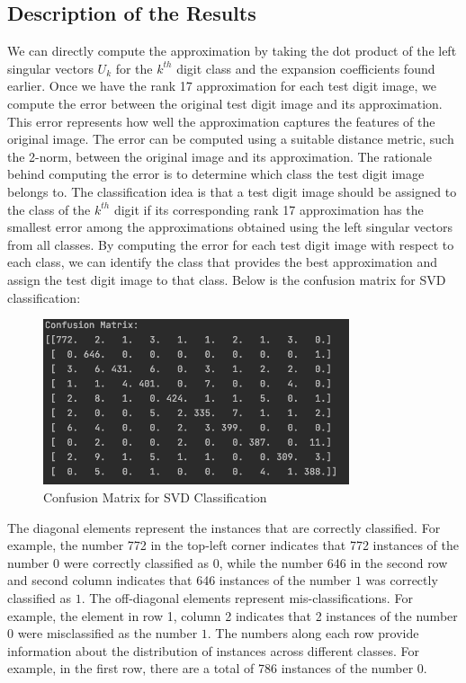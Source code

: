 \documentclass{article} %
\begin{document}
        \subsection{Description of the Results}
            \label{SECT: SECTION 4.2}
            We can directly compute the approximation by taking the dot product of the left singular vectors $U_k$ for the $k^{th}$ digit class and the expansion coefficients found earlier. Once we have the rank 17 approximation for each test digit image, we compute the error between the original test digit image and its approximation. This error represents how well the approximation captures the features of the original image. The error can be computed using a suitable distance metric, such the 2-norm, between the original image and its approximation. The rationale behind computing the error is to determine which class the test digit image belongs to. The classification idea is that a test digit image should be assigned to the class of the $k^{th}$ digit if its corresponding rank 17 approximation has the smallest error among the approximations obtained using the left singular vectors from all classes. By computing the error for each test digit image with respect to each class, we can identify the class that provides the best approximation and assign the test digit image to that class. Below is the confusion matrix for SVD classification:
            \begin{figure}[h]
                \centering
                \includegraphics[width=9cm]{Conf_Matrix_2.png}
                \caption{Confusion Matrix for SVD Classification}
                \label{fig:fig4}
            \end{figure}

            \FloatBarrier
            
            \noindent The diagonal elements represent the instances that are correctly classified. For example, the number 772 in the top-left corner indicates that 772 instances of the number $0$ were correctly classified as $0$, while the number 646 in the second row and second column indicates that 646 instances of the number $1$ was correctly classified as $1$. The off-diagonal elements represent mis-classifications. For example, the element in row 1, column 2 indicates that 2 instances of the number $0$ were misclassified as the number $1$. The numbers along each row provide information about the distribution of instances across different classes. For example, in the first row, there are a total of 786 instances of the number $0$. \\
            
\end{document}
